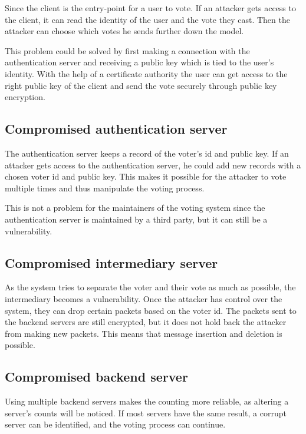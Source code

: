 \documentclass[a4paper,12pt,english]{article}
\begin{document}
Since the client is the entry-point for a user to vote. If an attacker gets access to the client, it can read the identity of the user and the vote they cast. Then the attacker can choose which votes he sends further down the model.

This problem could be solved by first making a connection with the authentication server and receiving a public key which is tied to the user's identity. With the help of a certificate authority the user can get access to the right public key of the client and send the vote securely through public key encryption.

\subsection{Compromised authentication server}\label{sec:limit-auth}

The authentication server keeps a record of the voter’s id and public key. If an attacker gets access to the authentication server, he could add new records with a chosen voter id and public key. This makes it possible for the attacker to vote multiple times and thus manipulate the voting process.

This is not a problem for the maintainers of the voting system since the authentication server is maintained by a third party, but it can still be a vulnerability.

\subsection{Compromised intermediary server}\label{sec:limit-intermediary}

As the system tries to separate the voter and their vote as much as possible, the intermediary becomes a vulnerability. Once the attacker has control over the system, they can drop certain packets based on the voter id. The packets sent to the backend servers are still encrypted, but it does not hold back the attacker from making new packets. This means that message insertion and deletion is possible.

\subsection{Compromised backend server}\label{sec:limit-backend}

Using multiple backend servers makes the counting more reliable, as altering a server's counts will be noticed. If most servers have the same result, a corrupt server can be identified, and the voting process can continue.
\end{document}
